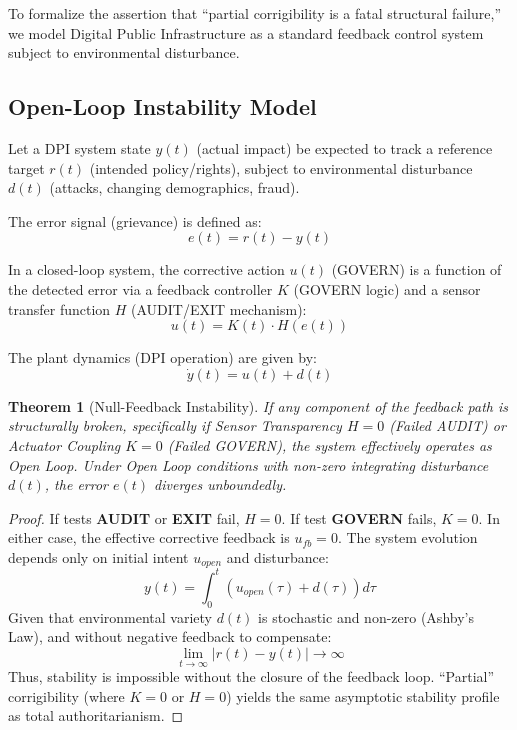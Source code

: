 \documentclass{article}
\newtheorem{theorem}{Theorem}
\begin{document}
\medskip

To formalize the assertion that ``partial corrigibility is a fatal structural failure,'' we model Digital Public Infrastructure as a standard feedback control system subject to environmental disturbance.

\subsection{Open-Loop Instability Model}

Let a DPI system state $y(t)$ (actual impact) be expected to track a reference target $r(t)$ (intended policy/rights), subject to environmental disturbance $d(t)$ (attacks, changing demographics, fraud).

The error signal (grievance) is defined as:
\begin{equation}
e(t) = r(t) - y(t)
\end{equation}

In a closed-loop system, the corrective action $u(t)$ (GOVERN) is a function of the detected error via a feedback controller $K$ (GOVERN logic) and a sensor transfer function $H$ (AUDIT/EXIT mechanism):
\begin{equation}
u(t) = K(t) \cdot H(e(t))
\end{equation}

The plant dynamics (DPI operation) are given by:
\begin{equation}
\dot{y}(t) = u(t) + d(t)
\end{equation}

\begin{theorem}[Null-Feedback Instability]
If any component of the feedback path is structurally broken, specifically if Sensor Transparency $H=0$ (Failed AUDIT) or Actuator Coupling $K=0$ (Failed GOVERN), the system effectively operates as Open Loop. Under Open Loop conditions with non-zero integrating disturbance $d(t)$, the error $e(t)$ diverges unboundedly.
\end{theorem}

\begin{proof}
If tests \textbf{AUDIT} or \textbf{EXIT} fail, $H=0$.
If test \textbf{GOVERN} fails, $K=0$.
In either case, the effective corrective feedback is $u_{fb} = 0$.
The system evolution depends only on initial intent $u_{open}$ and disturbance:
\begin{equation}
y(t) = \int_0^t (u_{open}(\tau) + d(\tau)) d\tau
\end{equation}
Given that environmental variety $d(t)$ is stochastic and non-zero (Ashby's Law), and without negative feedback to compensate:
\begin{equation}
\lim_{t \to \infty} |r(t) - y(t)| \to \infty
\end{equation}
Thus, stability is impossible without the closure of the feedback loop. ``Partial'' corrigibility (where $K=0$ or $H=0$) yields the same asymptotic stability profile as total authoritarianism.
\end{proof}
\end{document}
